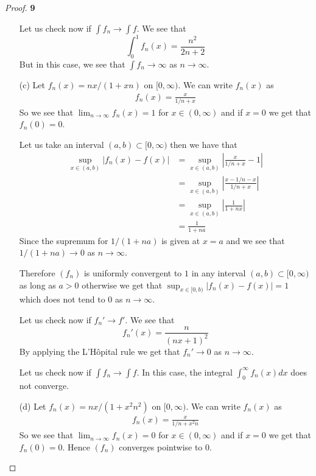 \documentclass[11pt]{article}
\theoremstyle{definition}
\begin{document}
\begin{proof}{\textbf{9}}
\begin{itemize}
    Let us check now if $\int f_n \to \int f$.
    We see that
    $$\int_{0}^1 f_n(x) = \frac{n^2}{2n+2}$$
    But in this case, we see that $\int f_n \to \infty$ as $n \to \infty$.

    \cleardoublepage
    \item [(c)] Let $f_n(x) = nx/(1 + xn)$ on $[0,\infty)$. We can write
    $f_n(x)$ as
    \begin{align*}
        f_n(x) = \frac{x}{1/n + x}
    \end{align*}
    So we see that $\lim_{n \to \infty} f_n(x) = 1$ for $x \in (0,\infty)$ and
    if $x = 0$ we get that $f_n(0) = 0$.

    Let us take an interval $(a,b) \subset [0,\infty)$
    then we have that
    \begin{align*}
        \sup_{x \in (a,b)}|f_n(x) - f(x)|
        &= \sup_{x \in (a,b)}\left|\frac{x}{1/n + x} - 1\right|\\
        &= \sup_{x \in (a,b)}\left|\frac{x - 1/n - x}{1/n + x}\right|\\
        &= \sup_{x \in (a,b)}\left|\frac{1}{1 + nx}\right|\\
        &= \frac{1}{1 + na}
    \end{align*}
    Since the supremum for $1/(1+na)$ is given at $x=a$
    and we see that $1/(1+na) \to 0$ as $n\to \infty$.

    Therefore $(f_n)$ is uniformly convergent to $1$ in any interval
    $(a,b) \subset [0,\infty)$ as long as $a > 0$ otherwise we get that
    $\sup_{x \in [0,b)}|f_n(x) - f(x)| = 1$ which does not tend to $0$ as
    $n \to \infty$.

    Let us check now if $f_n' \to f'$.
    We see that
    $$f_n'(x) = \frac{n}{(nx + 1)^2}$$
    By applying the L'Hôpital rule we get that $f_n' \to 0$ as $n \to \infty$.

    Let us check now if $\int f_n \to \int f$.
    In this case, the integral $\int_{0}^\infty f_n(x) dx$ does not converge.
\cleardoublepage
    \item [(d)] Let $f_n(x) = nx/(1 + x^2n^2)$ on $[0,\infty)$. We can write
    $f_n(x)$ as
    \begin{align*}
        f_n(x) = \frac{x}{1/n + x^2n}
    \end{align*}
    So we see that $\lim_{n \to \infty} f_n(x) = 0$ for $x \in (0,\infty)$ and
    if $x = 0$ we get that $f_n(0) = 0$. Hence $(f_n)$ converges pointwise
    to $0$.


\end{itemize}
\end{proof}
\end{document}
